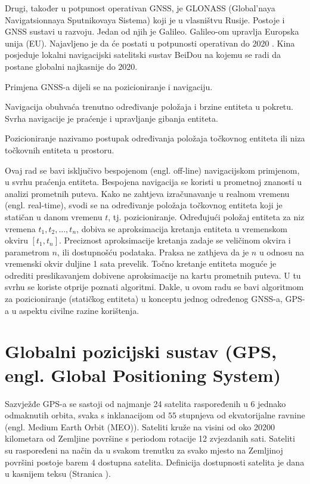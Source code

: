 \documentclass[a4paper,twoside,12pt]{memoir} %
\begin{document}
	Drugi, također u potpunost operativan GNSS, je GLONASS (Global'naya Navigatsionnaya Sputnikovaya Sistema) koji je u vlasništvu Rusije.
	Postoje i GNSS sustavi u razvoju. Jedan od njih je Galileo.
	Galileo-om upravlja Europska unija (EU). Najavljeno je da će postati u potpunosti operativan do 2020 \cite{bookProcessing}.
	Kina posjeduje lokalni navigacijski satelitski sustav BeiDou 
	na kojemu se radi da postane globalni najkasnije do 2020\cite{bookProcessing}.
	
	Primjena GNSS-a dijeli se na pozicioniranje i navigaciju.
	\begin{defn}[Navigacija]
		Navigacija obuhvaća trenutno određivanje položaja i brzine entiteta u pokretu.
		Svrha navigacije je praćenje i upravljanje gibanja entiteta.
	\end{defn}
	
	\begin{defn}[Pozicioniranje]
		Pozicioniranje nazivamo postupak određivanja položaja točkovnog entiteta ili niza 
		točkovnih entiteta u prostoru.
	\end{defn}
	Ovaj rad se bavi isključivo bespojenom (engl. off-line) navigacijskom primjenom, u svrhu praćenja entiteta.
	Bespojena navigacija se koristi u prometnoj znanosti u analizi prometnih puteva. Kako ne zahtjeva izračunavanje u realnom vremenu (engl. real-time),
	svodi se na određivanje položaja točkovnog entiteta koji je statičan u danom vremenu $t$, tj. pozicioniranje.
	Određujući položaj entiteta za niz vremena $ t_1,t_2, \hdots ,t_n $, dobiva se 
	aproksimacija kretanja entiteta u vremenskom okviru $[t_1,t_n]$.
	Preciznost aproksimacije kretanja zadaje se veličinom okvira i parametrom $n$, ili dostupnošću podataka.
	Praksa ne zathjeva da je $n$ u odnosu na vremenski okvir duljine 1 sata prevelik.
	Točno kretanje entiteta moguće je
	odrediti preslikavanjem dobivene aproksimacije na kartu prometnih puteva.
	U tu svrhu se koriste otprije poznati algoritmi.
	Dakle, u ovom radu se bavi algoritmom za pozicioniranje (statičkog entiteta)
	u konceptu jednog određenog GNSS-a, GPS-a u aspektu civilne razine korištenja.
	
	
\chapter[Globalni pozicijski sustav (GPS)][GPS]{Globalni pozicijski sustav (GPS, engl. Global Positioning System)}
	Sazvježđe GPS-a se sastoji od najmanje 24 satelita raspoređenih u 6 jednako odmaknutih orbita, svaka s inklanacijom od $55$ stupnjeva od ekvatorijalne
	ravnine (engl. Medium Earth Orbit (MEO)).
	Sateliti kruže na visini od oko 20200 kilometara od Zemljine površine s periodom rotacije 12 zvjezdanih sati. 
	Sateliti su raspoređeni na način da u svakom trenutku za svako mjesto na Zemljinoj površini postoje barem 4 dostupna satelita. Definicija dostupnosti satelita je dana u kasnijem teksu (Stranica \pageref{stranica:dostupnost}).
	
\end{document}
